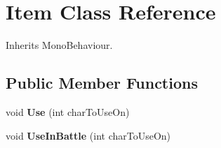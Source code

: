\hypertarget{class_item}{}\section{Item Class Reference}
\label{class_item}


Inherits Mono\+Behaviour.

\subsection*{Public Member Functions}
\begin{DoxyCompactItemize}
\item 
\mbox{\label{class_item_a2bc99ad58d77a1890aba78c5a1bc8673}} 
void {\bfseries Use} (int char\+To\+Use\+On)
\item 
\mbox{\label{class_item_a411b911c0276836212f6b9eb0f7eb9a7}} 
void {\bfseries Use\+In\+Battle} (int char\+To\+Use\+On)
\end{DoxyCompactItemize}
